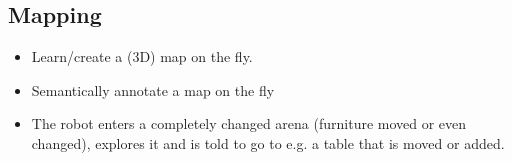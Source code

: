 \subsection{Mapping}
\begin{itemize}
	\item Learn/create a (3D) map on the fly.
	\item Semantically annotate a map on the fly
	\item The robot enters a completely changed arena (furniture moved or even changed), 
	   explores it and is told to go to e.g. a table that is moved or added.
\end{itemize}


